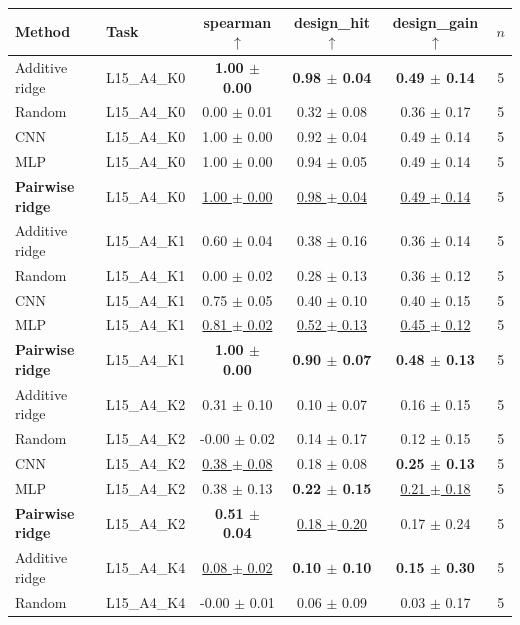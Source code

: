 \begin{tabular}{llcccc}
\toprule
Method & Task & spearman $\uparrow$ & design\_hit $\uparrow$ & design\_gain $\uparrow$ & $n$ \\
\midrule
Additive ridge & L15\_A4\_K0 & \textbf{1.00 $\pm$ 0.00} & \textbf{0.98 $\pm$ 0.04} & \textbf{0.49 $\pm$ 0.14} & 5 \\
Random & L15\_A4\_K0 & 0.00 $\pm$ 0.01 & 0.32 $\pm$ 0.08 & 0.36 $\pm$ 0.17 & 5 \\
CNN & L15\_A4\_K0 & 1.00 $\pm$ 0.00 & 0.92 $\pm$ 0.04 & 0.49 $\pm$ 0.14 & 5 \\
MLP & L15\_A4\_K0 & 1.00 $\pm$ 0.00 & 0.94 $\pm$ 0.05 & 0.49 $\pm$ 0.14 & 5 \\
\textbf{Pairwise ridge} & L15\_A4\_K0 & \underline{1.00 $\pm$ 0.00} & \underline{0.98 $\pm$ 0.04} & \underline{0.49 $\pm$ 0.14} & 5 \\
\midrule
Additive ridge & L15\_A4\_K1 & 0.60 $\pm$ 0.04 & 0.38 $\pm$ 0.16 & 0.36 $\pm$ 0.14 & 5 \\
Random & L15\_A4\_K1 & 0.00 $\pm$ 0.02 & 0.28 $\pm$ 0.13 & 0.36 $\pm$ 0.12 & 5 \\
CNN & L15\_A4\_K1 & 0.75 $\pm$ 0.05 & 0.40 $\pm$ 0.10 & 0.40 $\pm$ 0.15 & 5 \\
MLP & L15\_A4\_K1 & \underline{0.81 $\pm$ 0.02} & \underline{0.52 $\pm$ 0.13} & \underline{0.45 $\pm$ 0.12} & 5 \\
\textbf{Pairwise ridge} & L15\_A4\_K1 & \textbf{1.00 $\pm$ 0.00} & \textbf{0.90 $\pm$ 0.07} & \textbf{0.48 $\pm$ 0.13} & 5 \\
\midrule
Additive ridge & L15\_A4\_K2 & 0.31 $\pm$ 0.10 & 0.10 $\pm$ 0.07 & 0.16 $\pm$ 0.15 & 5 \\
Random & L15\_A4\_K2 & -0.00 $\pm$ 0.02 & 0.14 $\pm$ 0.17 & 0.12 $\pm$ 0.15 & 5 \\
CNN & L15\_A4\_K2 & \underline{0.38 $\pm$ 0.08} & 0.18 $\pm$ 0.08 & \textbf{0.25 $\pm$ 0.13} & 5 \\
MLP & L15\_A4\_K2 & 0.38 $\pm$ 0.13 & \textbf{0.22 $\pm$ 0.15} & \underline{0.21 $\pm$ 0.18} & 5 \\
\textbf{Pairwise ridge} & L15\_A4\_K2 & \textbf{0.51 $\pm$ 0.04} & \underline{0.18 $\pm$ 0.20} & 0.17 $\pm$ 0.24 & 5 \\
\midrule
Additive ridge & L15\_A4\_K4 & \underline{0.08 $\pm$ 0.02} & \textbf{0.10 $\pm$ 0.10} & \textbf{0.15 $\pm$ 0.30} & 5 \\
Random & L15\_A4\_K4 & -0.00 $\pm$ 0.01 & 0.06 $\pm$ 0.09 & 0.03 $\pm$ 0.17 & 5 \\

\end{tabular}
